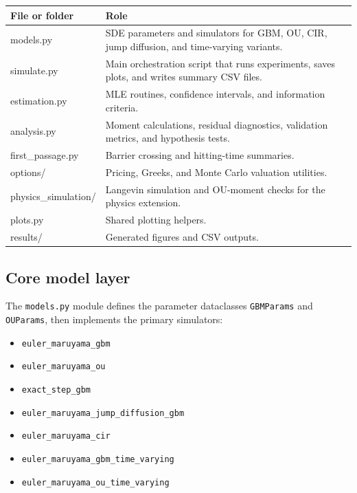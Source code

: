 \documentclass[11pt]{article}
\begin{document}
\begin{center}
\begin{tabular}{>{\ttfamily}p{} p{}}
\toprule
File or folder & Role \\
\midrule
models.py & SDE parameters and simulators for GBM, OU, CIR, jump diffusion, and time-varying variants. \\
simulate.py & Main orchestration script that runs experiments, saves plots, and writes summary CSV files. \\
estimation.py & MLE routines, confidence intervals, and information criteria. \\
analysis.py & Moment calculations, residual diagnostics, validation metrics, and hypothesis tests. \\
first\_passage.py & Barrier crossing and hitting-time summaries. \\
options/ & Pricing, Greeks, and Monte Carlo valuation utilities. \\
physics\_simulation/ & Langevin simulation and OU-moment checks for the physics extension. \\
plots.py & Shared plotting helpers. \\
results/ & Generated figures and CSV outputs. \\
\bottomrule
\end{tabular}
\end{center}

\subsection{Core model layer}

The \texttt{models.py} module defines the parameter dataclasses \texttt{GBMParams} and \texttt{OUParams}, then implements the primary simulators:
\begin{itemize}[leftmargin=1.2em]
  \item \texttt{euler\_maruyama\_gbm}
  \item \texttt{euler\_maruyama\_ou}
  \item \texttt{exact\_step\_gbm}
  \item \texttt{euler\_maruyama\_jump\_diffusion\_gbm}
  \item \texttt{euler\_maruyama\_cir}
  \item \texttt{euler\_maruyama\_gbm\_time\_varying}
  \item \texttt{euler\_maruyama\_ou\_time\_varying}
\end{itemize}
\end{document}
